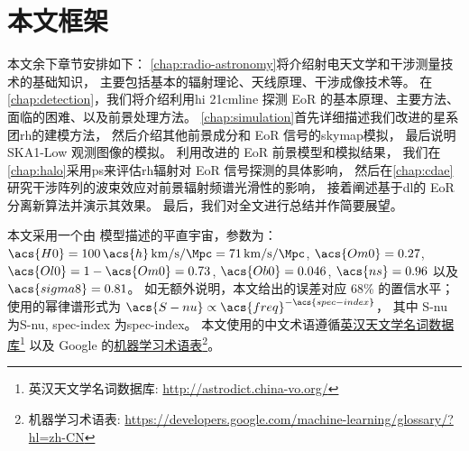 \section{本文框架}

本文余下章节安排如下：
\autoref{chap:radio-astronomy}将介绍射电天文学和干涉测量技术的基础知识，
主要包括基本的辐射理论、天线原理、干涉成像技术等。
在\autoref{chap:detection}，我们将介绍利用\ac{hi} \ac{21cmline}%
探测 EoR 的基本原理、主要方法、面临的困难、以及前景处理方法。
\autoref{chap:simulation}首先详细描述我们改进的星系团\ac{rh}的建模方法，
然后介绍其他前景成分和 EoR 信号的\ac{skymap}模拟，
最后说明 SKA1-Low 观测图像的模拟。
利用改进的 EoR 前景模型和模拟结果，
我们在\autoref{chap:halo}采用\ac{ps}来评估\ac{rh}辐射对 EoR 信号探测的具体影响，
然后在\autoref{chap:cdae}研究干涉阵列的波束效应对前景辐射频谱光滑性的影响，
接着阐述基于\ac{dl}的 EoR 分离新算法并演示其效果。
最后，我们对全文进行总结并作简要展望。

本文采用一个由 \lcdm 模型描述的平直宇宙，参数为：
$\acs{H0} = 100\,\acs{h}\,\si{\km\per\second\per\Mpc}
= \SI{71}{\km\per\second\per\Mpc}$,
$\acs{Om0} = 0.27$,
$\acs{Ol0} = 1 - \acs{Om0} = 0.73$,
$\acs{Ob0} = 0.046$,
$\acs{ns} = 0.96$ 以及 $\acs{sigma8} = 0.81$。
如无额外说明，本文给出的误差对应 68\% 的置信水平；
使用的幂律谱形式为 $\acs{S-nu} \propto \acs{freq}^{-\acs{spec-index}}$，
其中 \acs{S-nu} 为\acl{S-nu}, \acs{spec-index} 为\acl{spec-index}。
本文使用的中文术语遵循\href{%
  http://astrodict.china-vo.org/
}{英汉天文学名词数据库}\footnote{%
  英汉天文学名词数据库:
  \url{http://astrodict.china-vo.org/}}
以及 Google 的\href{%
  https://developers.google.com/machine-learning/glossary/?hl=zh-CN
}{机器学习术语表}\footnote{%
  机器学习术语表:
  \url{https://developers.google.com/machine-learning/glossary/?hl=zh-CN}}。


